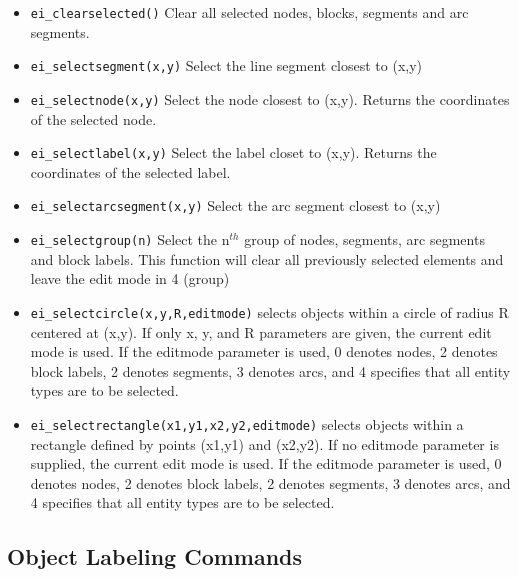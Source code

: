 \begin{itemize}
\item {\tt ei\_clearselected()} Clear all selected nodes, blocks, segments and arc
segments.

\item {\tt ei\_selectsegment(x,y)} Select the line segment closest to (x,y)

\item {\tt ei\_selectnode(x,y)} Select the node closest to (x,y).
Returns the coordinates of the selected node.

\item {\tt ei\_selectlabel(x,y)} Select the label closet to (x,y).
Returns the coordinates of the selected label.

\item {\tt ei\_selectarcsegment(x,y)} Select the arc segment closest to (x,y)

\item {\tt ei\_selectgroup(n)} Select the n$^{th}$ group of nodes, segments, arc
segments and block labels. This function will clear all previously selected
elements and leave the edit mode in 4 (group)

\item{\tt ei\_selectcircle(x,y,R,editmode)} selects objects within a circle of radius
R centered at (x,y).  If only x, y, and R parameters are given, the current
edit mode is used.  If the editmode parameter is used, 0 denotes nodes, 2
denotes block labels, 2 denotes segments, 3 denotes arcs, and 4 specifies
that all entity types are to be selected.

\item{\tt ei\_selectrectangle(x1,y1,x2,y2,editmode)} selects objects within a rectangle
defined by points (x1,y1) and (x2,y2). If no editmode parameter is supplied,
the current edit mode is used.  If the editmode parameter is used, 0 denotes
nodes, 2 denotes block labels, 2 denotes segments, 3 denotes arcs, and 4
specifies that all entity types are to be selected.
\end{itemize}


\subsection{Object Labeling Commands}

